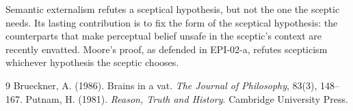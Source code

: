 \documentclass{situationist-preprint}
\begin{document}
Semantic externalism refutes a sceptical hypothesis, but not the one the sceptic needs. Its lasting contribution is to fix the form of the sceptical hypothesis: the counterparts that make perceptual belief unsafe in the sceptic's context are recently envatted. Moore's proof, as defended in EPI-02-a, refutes scepticism whichever hypothesis the sceptic chooses.

\begin{thebibliography}{9}\small
{} Brueckner, A. (1986). Brains in a vat. \emph{The Journal of Philosophy}, 83(3), 148--167.
 Putnam, H. (1981). \emph{Reason, Truth and History}. Cambridge University Press.
\end{thebibliography}
\end{document}
